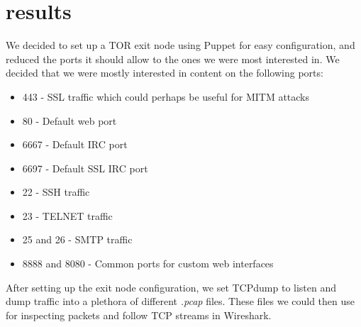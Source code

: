 \section{results}
We decided to set up a TOR exit node using Puppet for easy configuration, and reduced the ports it should allow to the ones we were most interested in. We decided that we were mostly interested in content on the following ports:\\

\begin{itemize}
	\item 443 - SSL traffic which could perhaps be useful for MITM attacks
	\item 80 - Default web port
	\item 6667 - Default IRC port
	\item 6697 - Default SSL IRC port
	\item 22 - SSH traffic
	\item 23 - TELNET traffic
	\item 25 and 26 - SMTP traffic
	\item 8888 and 8080 - Common ports for custom web interfaces
\end{itemize}

After setting up the exit node configuration, we set TCPdump to listen and dump traffic into a plethora of different \textit{.pcap} files. These files we could then use for inspecting packets and follow TCP streams in Wireshark.\\

